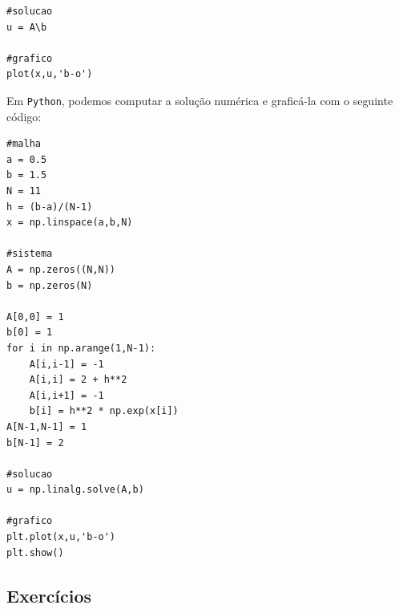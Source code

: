 \begin{resol}
\begin{verbatim}
#solucao
u = A\b

#grafico
plot(x,u,'b-o')
\end{verbatim}
\fi
\ifispython
Em \verb+Python+, podemos computar a solução numérica e graficá-la com o seguinte código:
\begin{verbatim}
#malha
a = 0.5
b = 1.5
N = 11
h = (b-a)/(N-1)
x = np.linspace(a,b,N)

#sistema
A = np.zeros((N,N))
b = np.zeros(N)

A[0,0] = 1
b[0] = 1
for i in np.arange(1,N-1):
    A[i,i-1] = -1
    A[i,i] = 2 + h**2
    A[i,i+1] = -1
    b[i] = h**2 * np.exp(x[i])
A[N-1,N-1] = 1
b[N-1] = 2

#solucao
u = np.linalg.solve(A,b)

#grafico
plt.plot(x,u,'b-o')
plt.show()
\end{verbatim}
\fi
\end{resol}

\subsection*{Exercícios}

